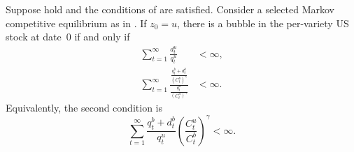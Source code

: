 \documentclass{article}
\begin{document}
\begin{thm}\label{thm_bubble_characterization}\label{thm_1}
Suppose  hold and the conditions of  are satisfied. Consider a selected Markov competitive equilibrium as in . If $z_0=u$, there is a bubble in the per-variety US stock at date~0 if and only if
\begin{subequations}\label{thm_cond1}
\begin{align}
\sum_{t=1}^\infty \frac{d_t^u}{q_t^u}&<\infty, \label{thm_cond_1a}\\
\sum_{t=1}^\infty
\frac{\frac{q_t^b+d_t^b}{(C_t^b)^\gamma}}{\frac{q_t^u}{(C_t^u)^\gamma}}&<\infty. \label{thm_cond_1b}
\end{align}
\end{subequations}
Equivalently, the second condition is
\[
\sum_{t=1}^\infty
\frac{q_t^b+d_t^b}{q_t^u}
\left(\frac{C_t^u}{C_t^b}\right)^\gamma
<\infty.
\]
\end{thm}
\end{document}
